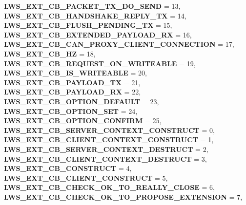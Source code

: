 \begin{DoxyCompactItemize}
{\bfseries L\+W\+S\+\_\+\+E\+X\+T\+\_\+\+C\+B\+\_\+\+P\+A\+C\+K\+E\+T\+\_\+\+T\+X\+\_\+\+D\+O\+\_\+\+S\+E\+ND} = 13, 
{\bfseries L\+W\+S\+\_\+\+E\+X\+T\+\_\+\+C\+B\+\_\+\+H\+A\+N\+D\+S\+H\+A\+K\+E\+\_\+\+R\+E\+P\+L\+Y\+\_\+\+TX} = 14, 
{\bfseries L\+W\+S\+\_\+\+E\+X\+T\+\_\+\+C\+B\+\_\+\+F\+L\+U\+S\+H\+\_\+\+P\+E\+N\+D\+I\+N\+G\+\_\+\+TX} = 15, 
\newline
{\bfseries L\+W\+S\+\_\+\+E\+X\+T\+\_\+\+C\+B\+\_\+\+E\+X\+T\+E\+N\+D\+E\+D\+\_\+\+P\+A\+Y\+L\+O\+A\+D\+\_\+\+RX} = 16, 
{\bfseries L\+W\+S\+\_\+\+E\+X\+T\+\_\+\+C\+B\+\_\+\+C\+A\+N\+\_\+\+P\+R\+O\+X\+Y\+\_\+\+C\+L\+I\+E\+N\+T\+\_\+\+C\+O\+N\+N\+E\+C\+T\+I\+ON} = 17, 
{\bfseries L\+W\+S\+\_\+\+E\+X\+T\+\_\+\+C\+B\+\_\+HZ} = 18, 
{\bfseries L\+W\+S\+\_\+\+E\+X\+T\+\_\+\+C\+B\+\_\+\+R\+E\+Q\+U\+E\+S\+T\+\_\+\+O\+N\+\_\+\+W\+R\+I\+T\+E\+A\+B\+LE} = 19, 
\newline
{\bfseries L\+W\+S\+\_\+\+E\+X\+T\+\_\+\+C\+B\+\_\+\+I\+S\+\_\+\+W\+R\+I\+T\+E\+A\+B\+LE} = 20, 
{\bfseries L\+W\+S\+\_\+\+E\+X\+T\+\_\+\+C\+B\+\_\+\+P\+A\+Y\+L\+O\+A\+D\+\_\+\+TX} = 21, 
{\bfseries L\+W\+S\+\_\+\+E\+X\+T\+\_\+\+C\+B\+\_\+\+P\+A\+Y\+L\+O\+A\+D\+\_\+\+RX} = 22, 
{\bfseries L\+W\+S\+\_\+\+E\+X\+T\+\_\+\+C\+B\+\_\+\+O\+P\+T\+I\+O\+N\+\_\+\+D\+E\+F\+A\+U\+LT} = 23, 
\newline
{\bfseries L\+W\+S\+\_\+\+E\+X\+T\+\_\+\+C\+B\+\_\+\+O\+P\+T\+I\+O\+N\+\_\+\+S\+ET} = 24, 
{\bfseries L\+W\+S\+\_\+\+E\+X\+T\+\_\+\+C\+B\+\_\+\+O\+P\+T\+I\+O\+N\+\_\+\+C\+O\+N\+F\+I\+RM} = 25, 
{\bfseries L\+W\+S\+\_\+\+E\+X\+T\+\_\+\+C\+B\+\_\+\+S\+E\+R\+V\+E\+R\+\_\+\+C\+O\+N\+T\+E\+X\+T\+\_\+\+C\+O\+N\+S\+T\+R\+U\+CT} = 0, 
{\bfseries L\+W\+S\+\_\+\+E\+X\+T\+\_\+\+C\+B\+\_\+\+C\+L\+I\+E\+N\+T\+\_\+\+C\+O\+N\+T\+E\+X\+T\+\_\+\+C\+O\+N\+S\+T\+R\+U\+CT} = 1, 
\newline
{\bfseries L\+W\+S\+\_\+\+E\+X\+T\+\_\+\+C\+B\+\_\+\+S\+E\+R\+V\+E\+R\+\_\+\+C\+O\+N\+T\+E\+X\+T\+\_\+\+D\+E\+S\+T\+R\+U\+CT} = 2, 
{\bfseries L\+W\+S\+\_\+\+E\+X\+T\+\_\+\+C\+B\+\_\+\+C\+L\+I\+E\+N\+T\+\_\+\+C\+O\+N\+T\+E\+X\+T\+\_\+\+D\+E\+S\+T\+R\+U\+CT} = 3, 
{\bfseries L\+W\+S\+\_\+\+E\+X\+T\+\_\+\+C\+B\+\_\+\+C\+O\+N\+S\+T\+R\+U\+CT} = 4, 
{\bfseries L\+W\+S\+\_\+\+E\+X\+T\+\_\+\+C\+B\+\_\+\+C\+L\+I\+E\+N\+T\+\_\+\+C\+O\+N\+S\+T\+R\+U\+CT} = 5, 
\newline
{\bfseries L\+W\+S\+\_\+\+E\+X\+T\+\_\+\+C\+B\+\_\+\+C\+H\+E\+C\+K\+\_\+\+O\+K\+\_\+\+T\+O\+\_\+\+R\+E\+A\+L\+L\+Y\+\_\+\+C\+L\+O\+SE} = 6, 
{\bfseries L\+W\+S\+\_\+\+E\+X\+T\+\_\+\+C\+B\+\_\+\+C\+H\+E\+C\+K\+\_\+\+O\+K\+\_\+\+T\+O\+\_\+\+P\+R\+O\+P\+O\+S\+E\+\_\+\+E\+X\+T\+E\+N\+S\+I\+ON} = 7, 

\end{DoxyCompactItemize}
